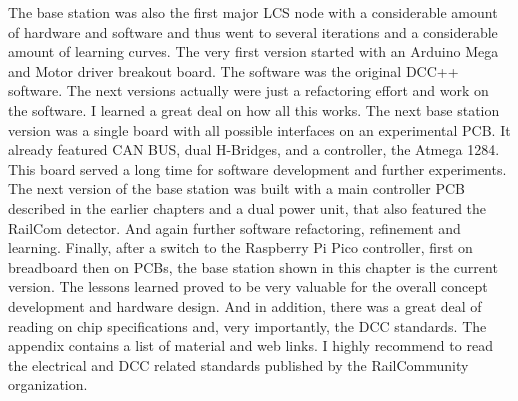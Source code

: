 The base station was also the first major LCS node with a considerable amount of hardware and software and thus went to several iterations and a considerable amount of learning curves. The very first version started with an Arduino Mega and Motor driver breakout board. The software was the original DCC++ software. The next versions actually were just a refactoring effort and work on the software. I learned a great deal on how all this works. The next base station version was a single board with all possible interfaces on an experimental PCB. It already featured CAN BUS, dual H-Bridges, and a controller, the Atmega 1284. This board served a long time for software development and further experiments. The next version of the base station was built with a main controller PCB described in the earlier chapters and a dual power unit, that also featured the RailCom detector. And again further software refactoring, refinement and learning. Finally, after a switch to the Raspberry Pi Pico controller, first on breadboard  then on PCBs, the base station shown in this chapter is the current version. The lessons learned proved to be very valuable for the overall concept development and hardware design. And in addition, there was a great deal of reading on chip specifications and, very importantly, the DCC standards. The appendix contains a list of material and web links. I highly recommend to read the electrical and DCC related standards published by the RailCommunity organization.

